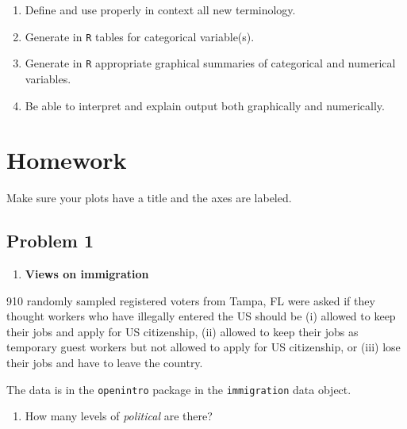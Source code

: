 \documentclass[
]{book}
\newenvironment{Shaded}{\begin{snugshade}}{\end{snugshade}}
\newcommand{\KeywordTok}[1]{\textcolor[rgb]{0.13,0.29,0.53}{\textbf{#1}}}
\newcommand{\NormalTok}[1]{#1}
\newcommand{\OperatorTok}[1]{\textcolor[rgb]{0.81,0.36,0.00}{\textbf{#1}}}
\providecommand{\tightlist}{%
  \setlength{\itemsep}{0pt}\setlength{\parskip}{0pt}}
\begin{document}
\begin{enumerate}
\def\labelenumi{\arabic{enumi})}
\tightlist
\item
  Define and use properly in context all new terminology.
\item
  Generate in \texttt{R} tables for categorical variable(s).\\
\item
  Generate in \texttt{R} appropriate graphical summaries of categorical and numerical variables.\\
\item
  Be able to interpret and explain output both graphically and numerically.
\end{enumerate}

\hypertarget{homework-5}{%
\section{Homework}\label{homework-5}}

Make sure your plots have a title and the axes are labeled.

\hypertarget{problem-1-5}{%
\subsection{Problem 1}\label{problem-1-5}}

\begin{enumerate}
\def\labelenumi{\arabic{enumi}.}
\tightlist
\item
  \textbf{Views on immigration}
\end{enumerate}

910 randomly sampled registered voters from Tampa, FL were asked if they thought workers who have illegally entered the US should be (i) allowed to keep their jobs and apply for US citizenship, (ii) allowed to keep their jobs as temporary guest workers but not allowed to apply for US citizenship, or (iii) lose their jobs and have to leave the country.

The data is in the \texttt{openintro} package in the \texttt{immigration} data object.

\begin{enumerate}
\def\labelenumi{\alph{enumi}.}
\tightlist
\item
  How many levels of \emph{political} are there?
\end{enumerate}

\begin{Shaded}
\end{Shaded}
\end{document}
